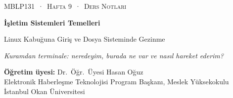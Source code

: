 \newcommand{\outl}[3]{\Needspace{5\baselineskip}}
\newcommand{\tl}{\textasciitilde}
\sloppy

\thispagestyle{empty}
\begin{tcolorbox}[enhanced,colback=dark,colframe=dark,arc=0pt,boxrule=0pt,
  left=18pt,right=18pt,top=20pt,bottom=20pt,coltext=white]
{\small\color{mint}\textsc{MBLP131 \,·\, Hafta 9 \,·\, Ders Notları}}\par\medskip
{\headfont\fontsize{26}{30}\selectfont\bfseries İşletim Sistemleri Temelleri}\par\medskip
{\large Linux Kabuğuna Giriş ve Dosya Sisteminde Gezinme}\par\smallskip
{\small\itshape\color{white!70} Kuramdan terminale: neredeyim, burada ne var ve nasıl hareket ederim?}
\end{tcolorbox}

\vspace{0.4em}
\begin{minipage}[t]{0.70\linewidth}
\small
\textbf{Öğretim üyesi:} Dr.\ Öğr.\ Üyesi Hasan Oğuz\\
Elektronik Haberleşme Teknolojisi Program Başkanı, Meslek Yüksekokulu\\
İstanbul Okan Üniversitesi
\end{minipage}

